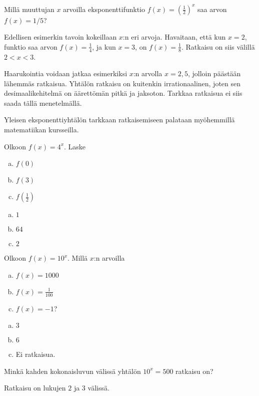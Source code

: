 \begin{esimerkki}
Millä muuttujan $x$ arvoilla eksponenttifunktio
$f(x) = \left( \frac{1}{2} \right)^{x}$ saa arvon
$f(x) = 1/5$?

Edellisen esimerkin tavoin kokeillaan $x$:n eri arvoja. Havaitaan,
että kun $x = 2$, funktio saa arvon $f(x) = \frac{1}{4}$, ja
kun $x = 3$, on $f(x) = \frac{1}{8}$. Ratkaisu on siis välillä
$2 < x < 3$.

Haarukointia voidaan jatkaa esimerkiksi $x$:n arvolla $x = 2,5$,
jolloin päästään lähemmäs ratkaisua. Yhtälön ratkaisu on kuitenkin
irrationaalinen, joten sen desimaalikehitelmä on äärettömän pitkä ja
jaksoton. Tarkkaa ratkaisua ei siis saada tällä menetelmällä.

Yleisen eksponenttiyhtälön tarkkaan ratkaisemiseen palataan myöhemmillä
matematiikan kursseilla.
\end{esimerkki}

\begin{tehtava}
Olkoon $f(x) = 4^x$. Laske
\begin{enumerate}[a)]
\item $f(0)$
\item $f(3)$
\item $f(\frac{1}{2})$
\end{enumerate}
\begin{vastaus}
\begin{enumerate}[a)]
\item $1$
\item $64$
\item $2$
\end{enumerate}
\end{vastaus}
\end{tehtava}

\begin{tehtava}
Olkoon $f(x) = 10^x$. Millä $x$:n arvoilla
\begin{enumerate}[a)]
\item $f(x) = 1000$
\item $f(x) = \frac{1}{100}$
\item $f(x) = -1$?
\end{enumerate}
\begin{vastaus}
\begin{enumerate}[a)]
\item $3$
\item $6$
\item Ei ratkaisua.
\end{enumerate}
\end{vastaus}
\end{tehtava}

\begin{tehtava}
Minkä kahden kokonaisluvun välissä yhtälön
$10^x = 500$ ratkaisu on?
\begin{vastaus}
Ratkaisu on lukujen $2$ ja $3$ välissä.
\end{vastaus}
\end{tehtava}
